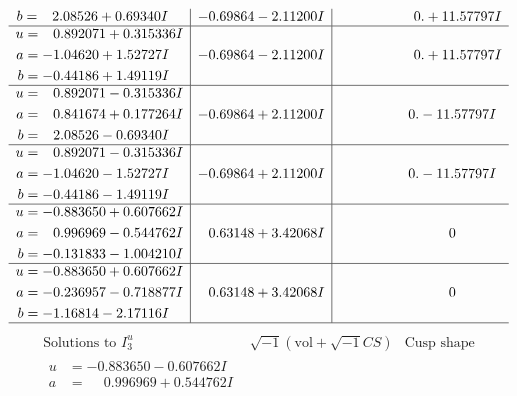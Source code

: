 \documentclass[1p]{elsarticle_modified}
\theoremstyle{definition}
\newcommand{\I}{\sqrt{-1}}
\begin{document}
$$\begin{array}{c|c|c}
\begin{aligned}
b &= \phantom{-}2.08526 + 0.69340 I\end{aligned}
 & -0.69864 - 2.11200 I & \phantom{-0.000000 -}0. + 11.57797 I \\ \hline\begin{aligned}
u &= \phantom{-}0.892071 + 0.315336 I \\
a &= -1.04620 + 1.52727 I \\
b &= -0.44186 + 1.49119 I\end{aligned}
 & -0.69864 - 2.11200 I & \phantom{-0.000000 -}0. + 11.57797 I \\ \hline\begin{aligned}
u &= \phantom{-}0.892071 - 0.315336 I \\
a &= \phantom{-}0.841674 + 0.177264 I \\
b &= \phantom{-}2.08526 - 0.69340 I\end{aligned}
 & -0.69864 + 2.11200 I & \phantom{-0.000000 } 0. - 11.57797 I \\ \hline\begin{aligned}
u &= \phantom{-}0.892071 - 0.315336 I \\
a &= -1.04620 - 1.52727 I \\
b &= -0.44186 - 1.49119 I\end{aligned}
 & -0.69864 + 2.11200 I & \phantom{-0.000000 } 0. - 11.57797 I \\ \hline\begin{aligned}
u &= -0.883650 + 0.607662 I \\
a &= \phantom{-}0.996969 - 0.544762 I \\
b &= -0.131833 - 1.004210 I\end{aligned}
 & \phantom{-}0.63148 + 3.42068 I & \phantom{-0.000000 } 0 \\ \hline\begin{aligned}
u &= -0.883650 + 0.607662 I \\
a &= -0.236957 - 0.718877 I \\
b &= -1.16814 - 2.17116 I\end{aligned}
 & \phantom{-}0.63148 + 3.42068 I & \phantom{-0.000000 } 0\\
 \hline 
 \end{array}$$\newpage$$\begin{array}{c|c|c}  
\text{Solutions to }I^u_{3}& \I (\text{vol} + \sqrt{-1}CS) & \text{Cusp shape}\\
 \hline 
\begin{aligned}
u &= -0.883650 - 0.607662 I \\
a &= \phantom{-}0.996969 + 0.544762 I \\

\end{aligned}
\end{array}$$
\end{document}
